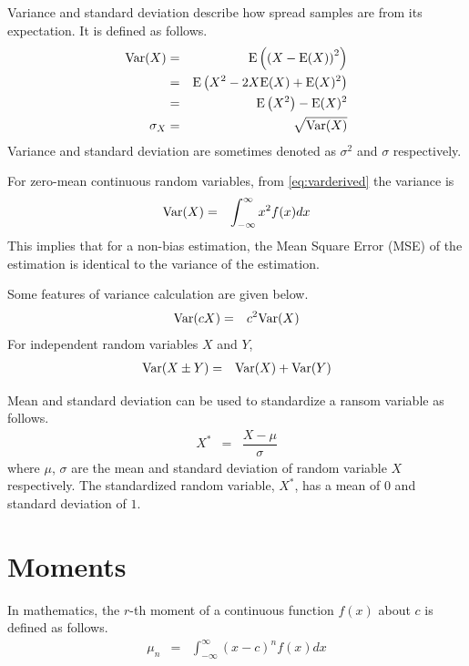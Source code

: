 Variance and standard deviation describe how spread samples are from its expectation. It is defined as follows.
\begin{eqnarray}
  \textup{Var}(X) &=& \textup{E}\left(\left(X-\textup{E}(X)\right)^2\right) \nonumber \\
  &=& \textup{E}\left(X^2-2X\textup{E}(X)+\textup{E}(X)^2\right) \nonumber \\
  &=& \textup{E}\left(X^2\right)-\textup{E}(X)^2 \label{eq:varderived} \\
  \sigma_X &=& \sqrt{\textup{Var}(X)} \nonumber
\end{eqnarray}
Variance and standard deviation are sometimes denoted as $\sigma^2$ and $\sigma$ respectively.

For zero-mean continuous random variables, from \eqref{eq:varderived} the variance is
\begin{eqnarray}
  \textup{Var}(X) &=& \int_{-\infty}^{\infty} x^2f(x)dx \nonumber 
\end{eqnarray}
This implies that for a non-bias estimation, the Mean Square Error (MSE) of the estimation is identical to the variance of the estimation. 

Some features of variance calculation are given below.
\begin{eqnarray}
  \textup{Var}(cX) &=& c^2\textup{Var}(X) \\
\end{eqnarray}
For independent random variables $X$ and $Y$,
\begin{eqnarray}
  \textup{Var}(X\pm Y) &=& \textup{Var}(X) + \textup{Var}(Y) \nonumber
\end{eqnarray}

Mean and standard deviation can be used to standardize a ransom variable as follows.
\begin{eqnarray}
  X^* &=& \dfrac{X-\mu}{\sigma} \nonumber
\end{eqnarray}
where $\mu$, $\sigma$ are the mean and standard deviation of random variable $X$ respectively. The standardized random variable, $X^*$, has a mean of $0$ and standard deviation of $1$.

\section{Moments}

In mathematics, the $r$-th moment of a continuous function $f(x)$ about $c$ is defined as follows.
\begin{eqnarray}
  \mu_n &=& \int_{-\infty}^{\infty}(x-c)^nf(x)dx \nonumber
\end{eqnarray}

